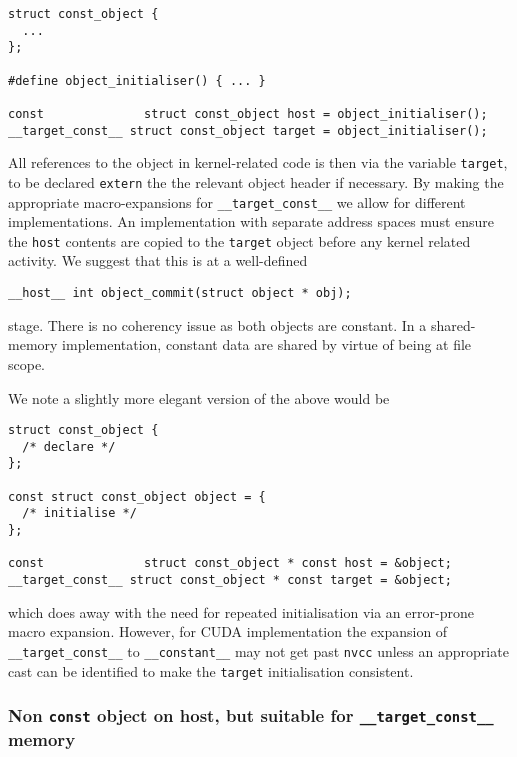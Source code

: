 \begin{lstlisting}
struct const_object {
  ...
};

#define object_initialiser() { ... }

const              struct const_object host = object_initialiser();
__target_const__ struct const_object target = object_initialiser();
\end{lstlisting}
All references to the object in kernel-related code is then via the
variable \texttt{target}, to be declared \texttt{extern} the the
relevant object header if necessary.
By making the appropriate macro-expansions for \texttt{\_\_target\_const\_\_}
we allow for different implementations. An implementation with separate
address spaces must ensure the \texttt{host}
contents are copied to the \texttt{target} object before any kernel
related activity. We suggest that this is at a well-defined
\begin{lstlisting}
__host__ int object_commit(struct object * obj);
\end{lstlisting}
stage. There is no coherency issue as both objects are constant. In a
shared-memory implementation, constant data are shared by virtue of
being at file scope.

We note a slightly more elegant version of the above would be
\begin{lstlisting}
struct const_object {
  /* declare */
};

const struct const_object object = {
  /* initialise */
};

const              struct const_object * const host = &object;
__target_const__ struct const_object * const target = &object;
\end{lstlisting}
which does away with the need for repeated initialisation via
an error-prone macro expansion. However,
for CUDA implementation the expansion of \texttt{\_\_target\_const\_\_}
to \texttt{\_\_constant\_\_}
may not get past \texttt{nvcc} unless an appropriate cast can
be identified to make the \texttt{target} initialisation consistent.

\subsubsection{Non \texttt{const} object on host, but suitable for
\texttt{\_\_target\_const\_\_} memory}

